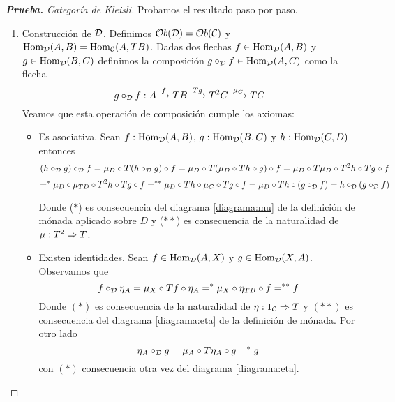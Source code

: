 \begin{proof}[\textbf{Prueba. } Categoría de Kleisli]
  Probamos el resultado paso por paso.
  \begin{enumerate}
  \item Construcción de $\mathcal{D}$. Definimos $\mathcal{O}b(\mathcal{D}) = \mathcal{O}b(\mathcal{C})$ y
    $\operatorname{Hom}_{\mathcal{D}}(A, B) = \operatorname{Hom}_{\mathcal{C}}(A, TB)$.
    Dadas dos flechas $f \in \operatorname{Hom}_{\mathcal{D}}(A, B)$ y
    $g \in \operatorname{Hom}_{\mathcal{D}}(B, C)$ definimos la composición $g \circ_{\mathcal{D}} f \in \operatorname{Hom}_{\mathcal{D}}(A, C)$
    como la flecha
    $$g \circ_{\mathcal{D}} f :
    A \xrightarrow{f} TB \xrightarrow{Tg} T^2 C \xrightarrow{\mu_C} T C
    $$
    Veamos que esta operación de composición
    cumple los axiomas:
    \begin{itemize}
    \item Es asociativa. Sean $f : \operatorname{Hom}_{\mathcal{D}}(A, B)$, $g : \operatorname{Hom}_{\mathcal{D}}(B, C)$
      y $h : \operatorname{Hom}_{\mathcal{D}}(C, D)$ entonces
      $$(h \circ_{\mathcal{D}} g) \circ_{\mathcal{D}} f = \mu_D \circ T(h \circ_{\mathcal{D}} g) \circ f
      = \mu_D \circ T(\mu_D \circ Th \circ g) \circ f
      = \mu_D \circ T\mu_D \circ T^2h \circ Tg \circ f$$
      $$=^* \mu_D \circ \mu_{TD} \circ T^2h \circ Tg \circ f
      =^{**}\mu_D \circ Th \circ \mu_C \circ Tg \circ f
      =\mu_D \circ Th \circ (g \circ_{\mathcal{D}} f)
      = h \circ_{\mathcal{D}} (g \circ_{\mathcal{D}} f)$$

      Donde ($*$) es consecuencia del diagrama \eqref{diagrama:mu}
      de la definición de mónada aplicado sobre $D$ y ($**$) es
      consecuencia de la naturalidad de $\mu : T^2\Rightarrow T$.

    \item Existen identidades. Sean
      $f \in \operatorname{Hom}_{\mathcal{D}}(A, X)$ y $g \in \operatorname{Hom}_{\mathcal{D}}(X, A)$. Observamos
      que
      $$f \circ_{\mathcal{D}} \eta_A = \mu_X \circ Tf \circ \eta_A
      =^* \mu_X \circ \eta_{TB} \circ f
      =^{**} f$$
    Donde $(*)$ es consecuencia de la naturalidad de
    $\eta : 1_{\mathcal{C}}\Rightarrow T$ y $(**)$ es consecuencia
    del diagrama \eqref{diagrama:eta} de la definición de mónada.
    Por otro lado
    $$\eta_A \circ_{\mathcal{D}} g = \mu_A \circ T\eta_A \circ g
    =^* g$$
    con $(*)$ consecuencia otra vez del diagrama \eqref{diagrama:eta}.


\end{itemize}
\end{enumerate}
\end{proof}
